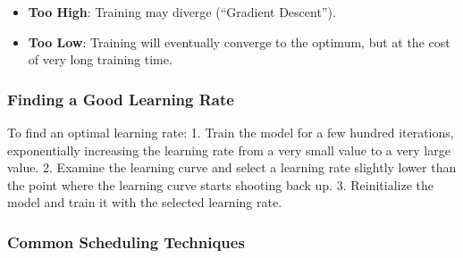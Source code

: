 \documentclass[
  letterpaper,
  DIV=11,
  numbers=noendperiod]{scrreprt}
\providecommand{\tightlist}{%
  \setlength{\itemsep}{0pt}\setlength{\parskip}{0pt}}\usepackage{longtable,booktabs,array}
\begin{document}
\begin{itemize}
\tightlist
\item
  \textbf{Too High}: Training may diverge (``Gradient Descent'').
\item
  \textbf{Too Low}: Training will eventually converge to the optimum,
  but at the cost of very long training time.
\end{itemize}

\subsubsection{Finding a Good Learning
Rate}\label{finding-a-good-learning-rate}

To find an optimal learning rate: 1. Train the model for a few hundred
iterations, exponentially increasing the learning rate from a very small
value to a very large value. 2. Examine the learning curve and select a
learning rate slightly lower than the point where the learning curve
starts shooting back up. 3. Reinitialize the model and train it with the
selected learning rate.

\subsubsection{Common Scheduling
Techniques}\label{common-scheduling-techniques}
\end{document}
